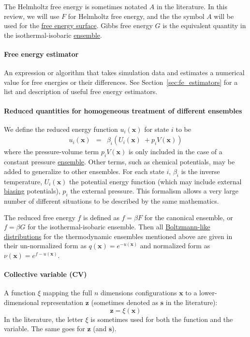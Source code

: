 \documentclass[9pt,review]{livecoms}
\newcommand{\vx}{\mathbf{x}}
\newcommand{\vz}{\mathbf{z}}
\begin{document}
The Helmholtz free energy is sometimes notated $A$ in the literature. In this review, we will use $F$ for Helmholtz free energy, and the the symbol $A$ will be used for the \hyperlink{ref:FES} {free energy surface}. Gibbs free energy $G$ is the equivalent quantity in the isothermal-isobaric \hyperlink{ref:Ensemble} {ensemble}.

\hypertarget{ref:FEestimator} {\paragraph{Free energy estimator}}
An expression or algorithm that takes simulation data and estimates a numerical value for free energies or their differences. See Section~\ref{sec:fe_estimators} for a list and description of useful free energy estimators.

\hypertarget{ref:reduced} {\paragraph{Reduced quantities for homogeneous treatment of different ensembles}}

We define the reduced energy function $u_i(\vx)$
for state $i$ to be
\begin{eqnarray}
u_i(\vx) &=& \beta_i ( U_i(\vx) \;
+ p_i V(\vx)) \label{equation:reduced-energy}
\end{eqnarray}
where the pressure-volume term $p_i V(\vx)$ is only included in the case of a constant pressure \hyperlink{ref:Ensemble} {ensemble}.
Other terms, such as chemical potentials, may be added to generalize to other ensembles.
For each state $i$, $\beta_i$ is the inverse temperature, $U_i(\vx)$ the potential energy function (which may include external \hyperlink{ref:biasingE} {biasing} potentials), $p_i$ the external pressure.
This formalism allows a very large number of different
situations to be described by the same mathematics.

The reduced free energy $f$ is defined as $f = \beta F$ for the canonical ensemble,
or $f = \beta G$ for the isothermal-isobaric ensemble.
Then all \hyperlink{ref:Distribution} {Boltzmann-like distributions} for the thermodynamic ensembles mentioned above are given in their un-normalized form as $q(\vx) = e^{-u(\vx)}$ and normalized form as
  $\nu(\vx) = e^{f-u(\vx)}$.


\hypertarget{ref:CV}{\paragraph{Collective variable (CV)}} A function $\xi$ mapping the full $n$ dimensions configurations $\vx$ to a lower-dimensional representation $\vz$ (sometimes denoted as $\mathbf{s}$ in the literature):
\begin{equation}
\vz = \xi(\vx)
\end{equation}
In the literature, the letter $\xi$ is sometimes used for both the function and the variable. The same goes for $\vz$ (and $\mathbf{s}$).
\end{document}
